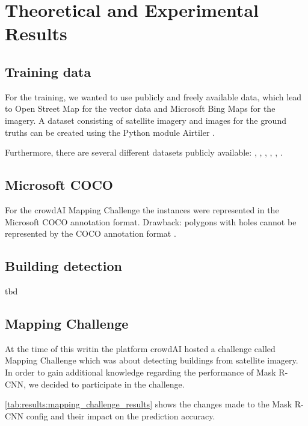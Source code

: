 
\chapter{Theoretical and Experimental Results}
\section{Training data}
For the training, we wanted to use publicly and freely available data, which lead to Open Street Map for the vector data and Microsoft Bing Maps for the imagery. A dataset consisting of satellite imagery and images for the ground truths can be created using the Python module Airtiler \cite{airtiler}.

Furthermore, there are several different datasets publicly available: \cite{VolodymyrMnih.2013}, \cite{spacenet}, \cite{isprs-vaihingen}, \cite{isprs-potsdam}, \cite{Helber.20170831}, \cite{deepsat}.

\section{Microsoft COCO}
For the crowdAI Mapping Challenge \cite{mappingchallenge} the instances were represented in the Microsoft COCO annotation format.
Drawback: polygons with holes cannot be represented by the COCO annotation format \cite{cocoformat}.

\section{Building detection}
tbd

\section{Mapping Challenge}
At the time of this writin the platform crowdAI hosted a challenge called Mapping Challenge \cite{mappingchallenge} which was about detecting buildings from satellite imagery. In order to gain additional knowledge regarding the performance of Mask R-CNN, we decided to participate in the challenge.

\autoref{tab:results:mapping_challenge_results} shows the changes made to the Mask R-CNN config and their impact on the prediction accuracy.


